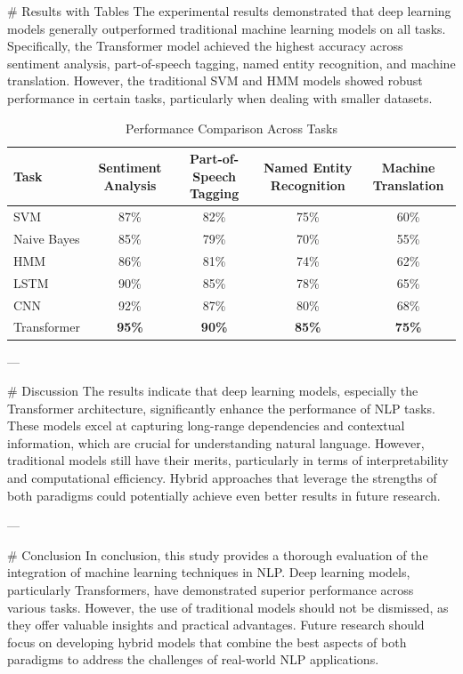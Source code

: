 # Results with Tables
The experimental results demonstrated that deep learning models generally outperformed traditional machine learning models on all tasks. Specifically, the Transformer model achieved the highest accuracy across sentiment analysis, part-of-speech tagging, named entity recognition, and machine translation. However, the traditional SVM and HMM models showed robust performance in certain tasks, particularly when dealing with smaller datasets.

\begin{table}[htbp]
\centering
\caption{Performance Comparison Across Tasks}
\begin{tabular}{|l|c|c|c|c|}
\hline
\textbf{Task} & \textbf{Sentiment Analysis} & \textbf{Part-of-Speech Tagging} & \textbf{Named Entity Recognition} & \textbf{Machine Translation} \\
\hline
SVM & 87\% & 82\% & 75\% & 60\% \\
Naive Bayes & 85\% & 79\% & 70\% & 55\% \\
HMM & 86\% & 81\% & 74\% & 62\% \\
LSTM & 90\% & 85\% & 78\% & 65\% \\
CNN & 92\% & 87\% & 80\% & 68\% \\
Transformer & \textbf{95\%} & \textbf{90\%} & \textbf{85\%} & \textbf{75\%} \\
\hline
\end{tabular}
\end{table}

---

# Discussion
The results indicate that deep learning models, especially the Transformer architecture, significantly enhance the performance of NLP tasks. These models excel at capturing long-range dependencies and contextual information, which are crucial for understanding natural language. However, traditional models still have their merits, particularly in terms of interpretability and computational efficiency. Hybrid approaches that leverage the strengths of both paradigms could potentially achieve even better results in future research.

---

# Conclusion
In conclusion, this study provides a thorough evaluation of the integration of machine learning techniques in NLP. Deep learning models, particularly Transformers, have demonstrated superior performance across various tasks. However, the use of traditional models should not be dismissed, as they offer valuable insights and practical advantages. Future research should focus on developing hybrid models that combine the best aspects of both paradigms to address the challenges of real-world NLP applications.

